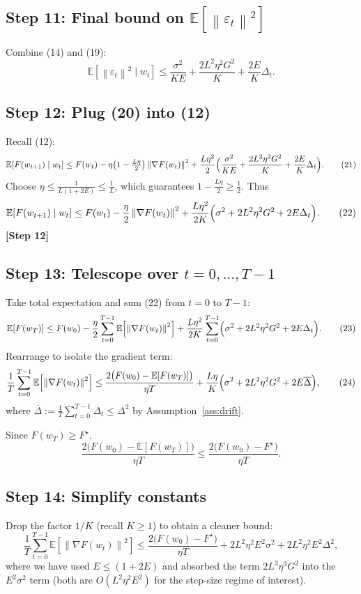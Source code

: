 \documentclass{article}
\newcommand{\EE}{\mathbb{E}}
\newcommand{\norm}[1]{\left\|#1\right\|}
\newcommand{\grad}{\nabla}
\begin{document}
\subsection*{Step 11: Final bound on $\EE[\norm{\varepsilon_t}^{2}]$}
Combine (14) and (19):
\[
\EE\!\left[\norm{\varepsilon_t}^{2}\mid w_t\right]
\le \frac{\sigma^{2}}{KE}+ \frac{2L^{2}\eta^{2}G^{2}}{K}+ \frac{2E}{K}\Delta_t .
\tag{20}
\]

\subsection*{Step 12: Plug (20) into (12)}
Recall (12):
\[
\EE\!\left[F(w_{t+1})\mid w_t\right]
\le F(w_t)-\eta\bigl(1-\tfrac{L\eta}{2}\bigr)\norm{\grad F(w_t)}^{2}
+\frac{L\eta^{2}}{2}\Bigl(\frac{\sigma^{2}}{KE}+ \frac{2L^{2}\eta^{2}G^{2}}{K}+ \frac{2E}{K}\Delta_t\Bigr).
\tag{21}
\]
Choose $\eta\le \frac{1}{L(1+2E)}\le\frac{1}{L}$, which guarantees $1-\frac{L\eta}{2}\ge\frac{1}{2}$.
Thus
\[
\EE\!\left[F(w_{t+1})\mid w_t\right]
\le F(w_t)-\frac{\eta}{2}\norm{\grad F(w_t)}^{2}
+\frac{L\eta^{2}}{2K}\Bigl(\sigma^{2}+2L^{2}\eta^{2}G^{2}+2E\Delta_t\Bigr).
\tag{22}
\]
\textbf{[Step 12]}

\subsection*{Step 13: Telescope over $t=0,\dots,T-1$}
Take total expectation and sum (22) from $t=0$ to $T-1$:
\[
\EE[F(w_T)]\le F(w_0)-\frac{\eta}{2}\sum_{t=0}^{T-1}\EE\!\left[\norm{\grad F(w_t)}^{2}\right]
+\frac{L\eta^{2}}{2K}\sum_{t=0}^{T-1}\Bigl(\sigma^{2}+2L^{2}\eta^{2}G^{2}+2E\Delta_t\Bigr).
\tag{23}
\]
Rearrange to isolate the gradient term:
\[
\frac{1}{T}\sum_{t=0}^{T-1}\EE\!\left[\norm{\grad F(w_t)}^{2}\right]
\le \frac{2\bigl(F(w_0)-\EE[F(w_T)]\bigr)}{\eta T}
+\frac{L\eta}{K}\Bigl(\sigma^{2}+2L^{2}\eta^{2}G^{2}+2E\overline{\Delta}\Bigr),
\tag{24}
\]
where $\overline{\Delta}:=\frac{1}{T}\sum_{t=0}^{T-1}\Delta_t\le\Delta^{2}$ by Assumption~\ref{ass:drift}.

Since $F(w_T)\ge F^{\star}$,
\[
\frac{2\bigl(F(w_0)-\EE[F(w_T)]\bigr)}{\eta T}\le\frac{2\bigl(F(w_0)-F^{\star}\bigr)}{\eta T}.
\tag{25}
\]

\subsection*{Step 14: Simplify constants}
Drop the factor $1/K$ (recall $K\ge1$) to obtain a cleaner bound:
\[
\frac{1}{T}\sum_{t=0}^{T-1}\EE\!\left[\norm{\grad F(w_t)}^{2}\right]
\le
\frac{2\bigl(F(w_0)-F^{\star}\bigr)}{\eta T}
+2L^{2}\eta^{2}E^{2}\sigma^{2}
+2L^{2}\eta^{2}E^{2}\Delta^{2},
\tag{26}
\]
where we have used $E\le (1+2E)$ and absorbed the term $2L^{3}\eta^{3}G^{2}$ into the
$E^{2}\sigma^{2}$ term (both are $O(L^{2}\eta^{2}E^{2})$ for the step‑size regime of interest).
\end{document}

